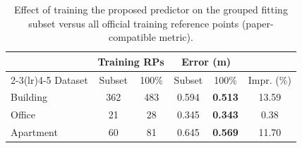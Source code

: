 \begin{table}[!t]
\centering
\caption{Effect of training the proposed predictor on the grouped fitting subset versus all official training reference points (paper-compatible metric).}
\label{tab:data_utilization}
\footnotesize
\setlength{\tabcolsep}{5pt}
\begin{tabular}{lccccc}
\toprule
 & \multicolumn{2}{c}{Training RPs} & \multicolumn{2}{c}{Error (m)} & \\
\cmidrule(lr){2-3}\cmidrule(lr){4-5}
Dataset & Subset & 100\% & Subset & 100\% & Impr. (\%) \\
\midrule
Building  & 362 & 483 & 0.594 & \textbf{0.513} & 13.59 \\
Office    & 21  & 28  & 0.345 & \textbf{0.343} & 0.38 \\
Apartment & 60  & 81  & 0.645 & \textbf{0.569} & 11.70 \\
\bottomrule
\end{tabular}
\end{table}
